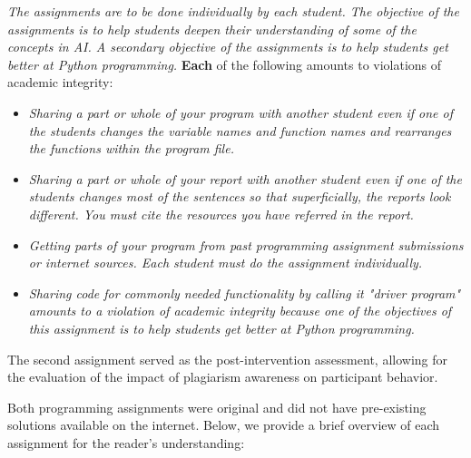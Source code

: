 \begin{myquote}
    \textit{The assignments are to be done individually by each student. The objective of the assignments is to help students deepen their understanding of some of the concepts in AI. A secondary objective of the assignments is to help students get better at Python programming.}
    \textbf{Each} of the following amounts to violations of academic integrity:
    \begin{itemize}
        \item \textit{Sharing a part or whole of your program with another student even if one of the students changes the variable names and function names and rearranges the functions within the program file.}
        \item \textit{Sharing a part or whole of your report with another student even if one of the students changes most of the sentences so that superficially, the reports look different. You must cite the resources you have referred in the report.} 
        \item \textit{Getting parts of your program from past programming assignment submissions or internet sources. Each student must do the assignment individually.}
        \item \textit{Sharing code for commonly needed functionality by calling it "driver program" amounts to a violation of academic integrity because one of the objectives of this assignment is to help students get better at Python programming. }
    \end{itemize}
\end{myquote}
The second assignment served as the post-intervention assessment, allowing for the evaluation of the impact of plagiarism awareness on participant behavior.

Both programming assignments were original and did not have pre-existing solutions available on the internet. Below, we provide a brief overview of each assignment for the reader's understanding:

